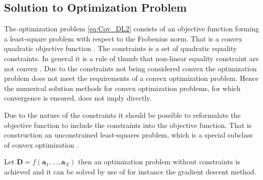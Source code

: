 \subsection{Solution to Optimization Problem}
The optimization problem \eqref{eq:Cov_DL2} consists of an objective function forming a least-square problem with respect to the Frobenius norm.
That is a convex quadratic objective function .
The constraints is a set of quadratic equality constraints. In general it is a rule of thumb that non-linear equality constraint are not convex .
Due to the constraints not being considered convex the optimization problem does not meet the requirements of a convex optimization problem. Hence the numerical solution methods for convex optimization problems, for which convergence is ensured, does not imply directly. 

Due to the nature of the constraints it should be possible to reformulate the objective function to include the constraints into the objective function. That is construction an unconstrained least-squares problem, which is a special subclass of convex optimization \cite{cvxbook}.

Let $\textbf{D} = f(\textbf{a}_1, \hdots, \textbf{a}_N)$ then an optimization problem without constraints is achieved and it can be solved by use of for instance the gradient descent method.

   

